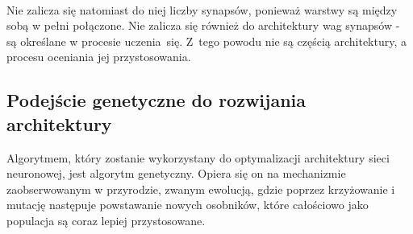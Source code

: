\noindent\\
Nie zalicza się natomiast do niej liczby synapsów,
ponieważ warstwy są między sobą w pełni połą\-czone.
Nie zalicza się również do architektury wag synapsów
- są określane w procesie ucze\-nia~się.
Z~tego powodu nie są częścią architektury,
a procesu oceniania jej przystosowania.

\subsection{Podejście genetyczne do rozwijania architektury}
Algorytmem, który zostanie wykorzystany do optymalizacji
architektury sieci neuronowej, jest algorytm genetyczny.
Opiera się on na mechanizmie zaobserwowanym w przyrodzie,
zwanym ewolucją, gdzie poprzez krzyżowanie i mutację
następuje powstawanie nowych osobników,
które całościowo jako populacja są coraz lepiej przystosowane.

